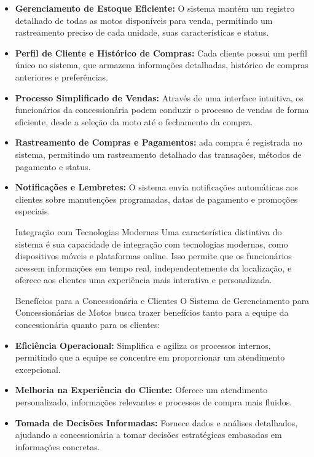         \begin{itemize}
        	\item \textbf{Gerenciamento de Estoque Eficiente:} O sistema mantém um registro detalhado de todas as motos disponíveis para venda, permitindo um rastreamento preciso de cada unidade, suas características e status.
        	
        	\item \textbf{Perfil de Cliente e Histórico de Compras:} Cada cliente possui um perfil único no sistema, que armazena informações detalhadas, histórico de compras anteriores e preferências.
        	
        	\item \textbf{Processo Simplificado de Vendas:} Através de uma interface intuitiva, os funcionários da concessionária podem conduzir o processo de vendas de forma eficiente, desde a seleção da moto até o fechamento da compra.
        	
        	\item \textbf{Rastreamento de Compras e Pagamentos:} ada compra é registrada no sistema, permitindo um rastreamento detalhado das transações, métodos de pagamento e status.
        	
        	\item \textbf{Notificações e Lembretes:} O sistema envia notificações automáticas aos clientes sobre manutenções programadas, datas de pagamento e promoções especiais.
        	
        	Integração com Tecnologias Modernas
        	Uma característica distintiva do sistema é sua capacidade de integração com tecnologias modernas, como dispositivos móveis e plataformas online. Isso permite que os funcionários acessem informações em tempo real, independentemente da localização, e oferece aos clientes uma experiência mais interativa e personalizada.
        	
        	Benefícios para a Concessionária e Clientes
        	O Sistema de Gerenciamento para Concessionárias de Motos busca trazer benefícios tanto para a equipe da concessionária quanto para os clientes:
        	
        	\item \textbf{Eficiência Operacional:} Simplifica e agiliza os processos internos, permitindo que a equipe se concentre em proporcionar um atendimento excepcional.
        	
        	\item \textbf{Melhoria na Experiência do Cliente:} Oferece um atendimento personalizado, informações relevantes e processos de compra mais fluidos.
        	
        	\item \textbf{Tomada de Decisões Informadas:} Fornece dados e análises detalhados, ajudando a concessionária a tomar decisões estratégicas embasadas em informações concretas.
        \end{itemize}
        

